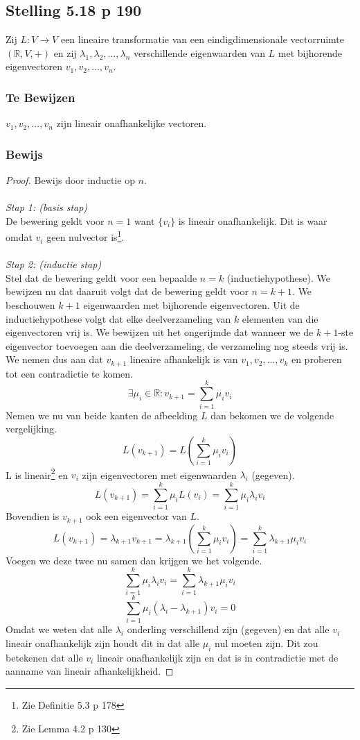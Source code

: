 \documentclass[lineaire_algebra_oplossingen.tex]{subfiles}
\begin{document}
\subsection{Stelling 5.18 p 190}
\label{5.18}
Zij $L:V\rightarrow V$ een lineaire transformatie van een eindigdimensionale vectorruimte $(\mathbb{R},V,+)$ en zij $\lambda_1,\lambda_2,...,\lambda_n$ verschillende eigenwaarden van $L$ met bijhorende eigenvectoren $v_1,v_2,...,v_n$.

\subsubsection*{Te Bewijzen}
$v_1,v_2,...,v_n$ zijn lineair onafhankelijke vectoren.

\subsubsection*{Bewijs}
\begin{proof}
Bewijs door inductie op $n$.\\\\
\emph{Stap 1: (basis stap)}\\
De bewering geldt voor $n=1$ want $\{v_i\}$ is lineair onafhankelijk. Dit is waar omdat $v_i$ geen nulvector is\footnote{Zie Definitie 5.3 p 178}.\\\\
\emph{Stap 2: (inductie stap)}\\
Stel dat de bewering geldt voor een bepaalde $n=k$ (inductiehypothese). We bewijzen nu dat daaruit volgt dat de bewering geldt voor $n=k+1$.
We beschouwen $k+1$ eigenwaarden met bijhorende eigenvectoren. Uit de inductiehypothese volgt dat elke deelverzameling van $k$ elementen van die eigenvectoren vrij is.
We bewijzen uit het ongerijmde dat wanneer we de $k+1$-ste eigenvector toevoegen aan die deelverzameling, de verzameling nog steeds vrij is.
We nemen dus aan dat $v_{k+1}$ lineaire afhankelijk is van $v_1,v_2,...,v_k$ en proberen tot een contradictie te komen.
\[
\exists \mu_i\in\mathbb{R} : v_{k+1} = \sum_{i=1}^k\mu_iv_i
\]
Nemen we nu van beide kanten de afbeelding $L$ dan bekomen we de volgende vergelijking.
\[
L( v_{k+1}) = L\left(\sum_{i=1}^k\mu_iv_i\right)
\]
L is lineair\footnote{Zie Lemma 4.2 p 130} en $v_i$ zijn eigenvectoren met eigenwaarden $\lambda_i$ (gegeven).
\[
L(v_{k+1}) = \sum_{i=1}^k\mu_iL(v_i) = \sum_{i=1}^k\mu_i\lambda_iv_i
\]
Bovendien is $v_{k+1}$ ook een eigenvector van $L$.
\[
L(v_{k+1}) = \lambda_{k+1}v_{k+1} = \lambda_{k+1}\left(\sum_{i=1}^k\mu_iv_i\right) = \sum_{i=1}^k\lambda_{k+1}\mu_iv_i
\]
Voegen we deze twee nu samen dan krijgen we het volgende.
\[
\sum_{i=1}^k\mu_i\lambda_iv_i = \sum_{i=1}^k\lambda_{k+1}\mu_iv_i
\]
\[
\sum_{i=1}^k \mu_i(\lambda_i-\lambda_{k+1})v_i = 0
\]
Omdat we weten dat alle $\lambda_i$ onderling verschillend zijn (gegeven) en dat alle $v_i$ lineair onafhankelijk zijn houdt dit in dat alle $\mu_i$ nul moeten zijn. Dit zou betekenen dat alle $v_i$ lineair onafhankelijk zijn en dat is in contradictie met de aanname van lineair afhankelijkheid.
\end{proof}
\end{document}
